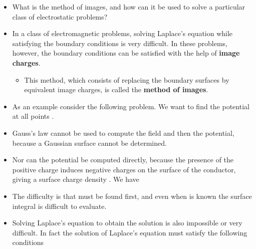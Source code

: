 \begin{ELunit}


\begin{itemize}
\item
  What is the method of images, and how can it be used to solve a particular class of electrostatic problems?
\item
  In a class of electromagnetic problems, solving Laplace's equation while satisfying the boundary conditions is very difficult. In these problems, however, the boundary conditions can be satisfied with the help of \textbf{image charges}.

  \begin{itemize}
  \tightlist
  \item
    This method, which consists of replacing the boundary surfaces by equivalent image charges, is called the \textbf{method of images}.
  \end{itemize}
\item
  As an example consider the following problem. We want to find the potential at all points .
\end{itemize}


\begin{itemize}
\tightlist
\item
  Gauss's law cannot be used to compute the field and then the potential, because a Gaussian surface cannot be determined.
\item
  Nor can the potential be computed directly, because the presence of the positive charge  induces negative charges on the surface of the conductor, giving a surface charge density . We have
\end{itemize}


\begin{itemize}
\tightlist
\item
  The difficulty is that  must be found first, and even when  is known the surface integral is difficult to evaluate.
\item
  Solving Laplace's equation to obtain the solution is also impossible or very difficult. In fact the solution of Laplace's equation must satisfy the following conditions
\end{itemize}


\end{ELunit}
